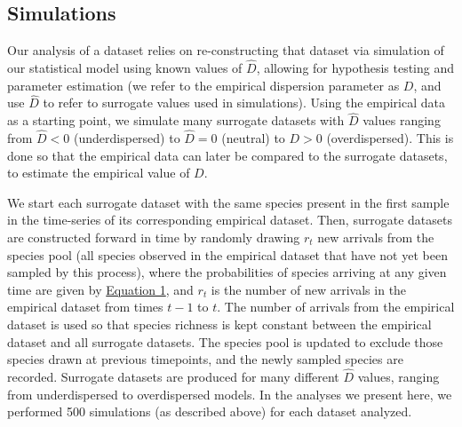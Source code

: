 \documentclass{article}
\begin{document}
\subsection{Simulations} \label{sec:simulations}
Our analysis of a dataset relies on re-constructing that dataset via simulation of our statistical model using known values of \(\hat{D}\), allowing for hypothesis testing and parameter estimation (we refer to the empirical dispersion parameter as \(D\), and use \(\hat{D}\) to refer to surrogate values used in simulations). Using the empirical data as a starting point, we simulate many surrogate datasets with \(\hat{D}\) values ranging from \(\hat{D}<0\) (underdispersed) to \(\hat{D}=0\) (neutral) to \(D>0\) (overdispersed). This is done so that the empirical data can later be compared to the surrogate datasets, to estimate the empirical value of \(D\).
\par
We start each surrogate dataset with the same species present in the first sample in the time-series of its corresponding empirical dataset. Then, surrogate datasets are constructed forward in time by randomly drawing \(r_t\) new arrivals from the species pool (all species observed in the empirical dataset that have not yet been sampled by this process), where the probabilities of species arriving at any given time are given by  \hyperref[sec:equation1]{Equation 1}, and \(r_t\) is the number of new arrivals in the empirical dataset from times \(t-1\) to \(t\). The number of arrivals from the empirical dataset is used so that species richness is kept constant between the empirical dataset and all surrogate datasets. The species pool is updated to exclude those species drawn at previous timepoints, and the newly sampled species are recorded. Surrogate datasets are produced for many different \(\hat{D}\) values, ranging from underdispersed to overdispersed models. In the analyses we present here, we performed 500 simulations (as described above) for each dataset analyzed.
\end{document}
